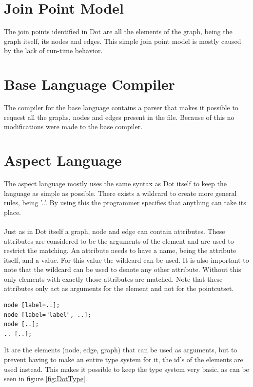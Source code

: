 \documentclass[a4paper]{report}
\begin{document}
\section{Join Point Model}
The join points identified in Dot are all the elements of the graph, being the graph itself, its nodes and edges. This simple join point model is mostly caused by the lack of run-time behavior.

\section{Base Language Compiler}
The compiler for the base language contains a parser that makes it possible to request all the graphs, nodes and edges present in the file. Because of this no modifications were made to the base compiler.

\section{Aspect Language}
The aspect language mostly uses the same syntax as Dot itself to keep the language as simple as possible. There exists a wildcard to create more general rules, being '..'. By using this the programmer specifies that anything can take its place.\\
\\
Just as in Dot itself a graph, node and edge can contain attributes. These attributes are considered to be the arguments of the element and are used to restrict the matching. An attribute needs to have a name, being the attribute itself, and a value. For this value the wildcard can be used. It is also important to note that the wildcard can be used to denote any other attribute. Without this only elements with exactly those attributes are matched. Note that these attributes only act as arguments for the element and not for the pointcutset.
\begin{lstlisting}[multicols=2,caption=Examples of using the wildcard.,label=lst:Dot_Wildcard]
node [label=..];
node [label="label", ..];
node [..];
.. [..];
\end{lstlisting}
It are the elements (node, edge, graph) that can be used as arguments, but to prevent having to make an entire type system for it, the id's of the elements are used instead. This makes it possible to keep the type system very basic, as can be seen in figure \ref{fig:DotType}.
\end{document}
